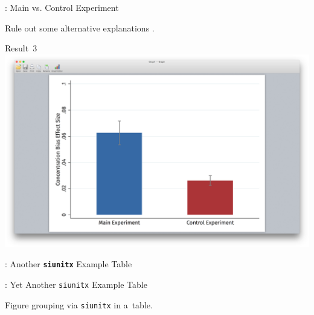 \begin{frame}{\titleprefix: Main vs. Control Experiment}

	Rule out some alternative explanations \citep{Dertwinkel-Kalt2017}.
	
	\bigskip
	
	\centering
	{\small \alert{Result~3}} \\[15pt]
	\includegraphics[height=0.5\textheight, trim={3.75in 1.75in 3.75in 2in}, clip]
		{1_Example_Content/Images/average_main_control.png}

\end{frame}


\begin{frame}{\titleprefix: Another \textbf{\texttt{siunitx}} Example Table}

	\begin{table}
	\caption{%
		Example of a~regression table \citep[adapted from][]{Gerhardt2017}.
		Never forget to mention the dependent variable (here, $m_\sim$)!%
	}
	\label{tab:lin_reg_interactions}
	\resizebox*{!}{0.59\textheight}{%
		\mdseries\selectfont
		
	}
	\end{table}

\end{frame}


\begin{frame}{\titleprefix: Yet Another \texttt{siunitx} Example Table}

	\begin{table}
		\caption{Figure grouping via \texttt{siunitx} in a~table.}
		
	\end{table}

\end{frame}


